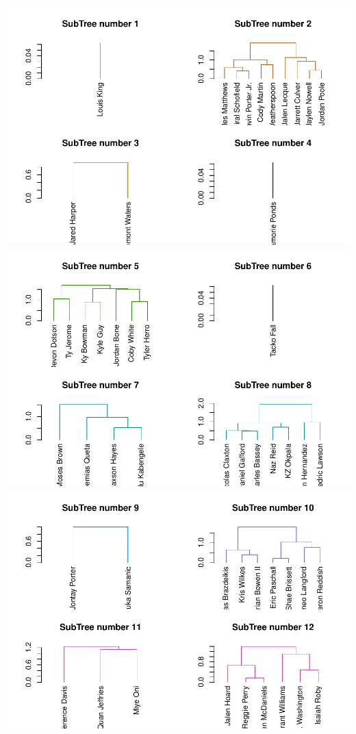 \documentclass[]{article}
\begin{document}
\includegraphics{project-measure-writeup_files/figure-latex/hclust-nbarookies-3.pdf}
\includegraphics{project-measure-writeup_files/figure-latex/hclust-nbarookies-4.pdf}
\includegraphics{project-measure-writeup_files/figure-latex/hclust-nbarookies-5.pdf}
\end{document}

